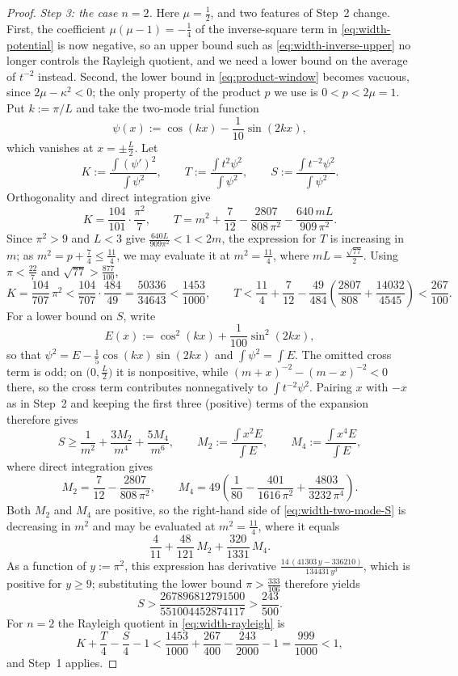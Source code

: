 \documentclass[10pt,a4paper]{amsart}
\begin{document}
\begin{proof}
\emph{Step 3: the case $n=2$.} Here $\mu=\frac12$, and two features of Step~2 change. First, the coefficient $\mu(\mu-1)=-\frac14$ of the inverse-square term in \eqref{eq:width-potential} is now negative, so an upper bound such as \eqref{eq:width-inverse-upper} no longer controls the Rayleigh quotient, and we need a lower bound on the average of $t^{-2}$ instead. Second, the lower bound in \eqref{eq:product-window} becomes vacuous, since $2\mu-\kappa^2<0$; the only property of the product $p$ we use is $0<p<2\mu=1$. Put $k:=\pi/L$ and take the two-mode trial function
\[
    \psi(x):=\cos(kx)-\frac1{10}\sin(2kx),
\]
which vanishes at $x=\pm\frac L2$. Let
\[
    K:=\frac{\int(\psi')^2}{\int\psi^2},
    \qquad
    T:=\frac{\int t^2\psi^2}{\int\psi^2},
    \qquad
    S:=\frac{\int t^{-2}\psi^2}{\int\psi^2}.
\]
Orthogonality and direct integration give
\begin{equation}\label{eq:width-two-mode-KT}
    K=\frac{104}{101}\cdot\frac{\pi^2}7,
    \qquad
    T=m^2+\frac7{12}-\frac{2807}{808\,\pi^2}-\frac{640\,mL}{909\,\pi^2}.
\end{equation}
Since $\pi^2>9$ and $L<3$ give $\frac{640L}{909\pi^2}<1<2m$, the expression for $T$ is increasing in $m$; as $m^2=p+\frac74\leq\frac{11}4$, we may evaluate it at $m^2=\frac{11}4$, where $mL=\frac{\sqrt{77}}2$. Using $\pi<\frac{22}7$ and $\sqrt{77}>\frac{877}{100}$,
\[
    K=\frac{104}{707}\,\pi^2<\frac{104}{707}\cdot\frac{484}{49}=\frac{50336}{34643}<\frac{1453}{1000},
    \qquad
    T<\frac{11}4+\frac7{12}-\frac{49}{484}\left(\frac{2807}{808}+\frac{14032}{4545}\right)<\frac{267}{100}.
\]
For a lower bound on $S$, write
\[
    E(x):=\cos^2(kx)+\frac1{100}\sin^2(2kx),
\]
so that $\psi^2=E-\frac15\cos(kx)\sin(2kx)$ and $\int\psi^2=\int E$. The omitted cross term is odd; on $\bigl(0,\frac L2\bigr)$ it is nonpositive, while $(m+x)^{-2}-(m-x)^{-2}<0$ there, so the cross term contributes nonnegatively to $\int t^{-2}\psi^2$. Pairing $x$ with $-x$ as in Step~2 and keeping the first three (positive) terms of the expansion therefore gives
\begin{equation}\label{eq:width-two-mode-S}
    S\geq\frac1{m^2}+\frac{3M_2}{m^4}+\frac{5M_4}{m^6},
    \qquad
    M_2:=\frac{\int x^2E}{\int E},
    \qquad
    M_4:=\frac{\int x^4E}{\int E},
\end{equation}
where direct integration gives
\[
    M_2=\frac7{12}-\frac{2807}{808\,\pi^2},
    \qquad
    M_4=49\left(\frac1{80}-\frac{401}{1616\,\pi^2}+\frac{4803}{3232\,\pi^4}\right).
\]
Both $M_2$ and $M_4$ are positive, so the right-hand side of \eqref{eq:width-two-mode-S} is decreasing in $m^2$ and may be evaluated at $m^2=\frac{11}4$, where it equals
\[
    \frac4{11}+\frac{48}{121}\,M_2+\frac{320}{1331}\,M_4 .
\]
As a function of $y:=\pi^2$, this expression has derivative $\frac{14\,(41303\,y-336210)}{134431\,y^3}$, which is positive for $y\geq9$; substituting the lower bound $\pi>\frac{333}{106}$ therefore yields
\[
    S>\frac{267896812791500}{551004452874117}>\frac{243}{500}.
\]
For $n=2$ the Rayleigh quotient in \eqref{eq:width-rayleigh} is
\[
    K+\frac T4-\frac S4-1
    <\frac{1453}{1000}+\frac{267}{400}-\frac{243}{2000}-1
    =\frac{999}{1000}<1,
\]
and Step~1 applies.
\end{proof}
\end{document}

